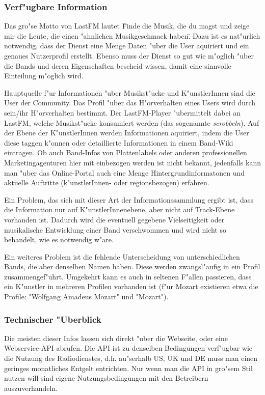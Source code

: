 \subsubsection{Verf"ugbare Information}
Das gro"se Motto von LastFM lautet \"Finde die Musik, die du magst und zeige mir die Leute, die einen "ahnlichen Musikgeschmack haben\". Dazu ist es nat"urlich notwendig, dass der Dienst eine Menge Daten "uber die User aquiriert und ein genaues Nutzerprofil erstellt. Ebenso muss der Dienst so gut wie m"oglich "uber die Bands und deren Eigenschaften bescheid wissen, damit eine sinnvolle Einteilung m"oglich wird.

Hauptquelle f"ur Informationen "uber Musikst"ucke und K"unstlerInnen sind die User der Community. Das Profil "uber das H"orverhalten eines Users wird durch sein/ihr H"orverhalten bestimmt. Der LastFM-Player "ubermittelt dabei an LastFM, welche Musikst"ucke konsumiert werden (das sogenannte \textit{scrobbeln}). Auf der Ebene der K"unstlerInnen werden Informationen aquiriert, indem die User diese taggen k"onnen oder detaillierte Informationen in einem Band-Wiki eintragen. Ob auch Band-Infos von Plattenlabels oder anderen professionellen Marketingagenturen hier mit einbezogen werden ist nicht bekannt, jedenfalls kann man "uber das Online-Portal auch eine Menge Hintergrundinformatonen und aktuelle Auftritte (k"unstlerInnen- oder regionsbezogen) erfahren. 

Ein Problem, das sich mit dieser Art der Informationssammlung ergibt ist, dass die Information nur auf K"unstlerInnenebene, aber nicht auf Track-Ebene vorhanden ist. Dadurch wird die eventuell gegebene Vielseitigkeit oder musikalische Entwicklung einer Band verschwommen und wird nicht so behandelt, wie es notwendig w"are. 

Ein weiteres Problem ist die fehlende Unterscheidung von unterschiedlichen Bands, die aber denselben Namen haben. Diese werden zwangsl"aufig in ein Profil zusammengef"uhrt. Umgekehrt kann es auch in seltenen F"allen passieren, dass ein K"unstler in mehreren Profilen vorhanden ist (f"ur Mozart existieren etwa die Profile: "Wolfgang Amadeus Mozart" und "Mozart").

\subsubsection{Technischer "Uberblick}
Die meisten dieser Infos lassen sich direkt "uber die Webseite, oder eine Webservice-API abrufen. Die API ist zu denselben Bedingungen verf"ugbar wie die Nutzung des Radiodienstes, d.h. au"serhalb US, UK und DE muss man einen geringes monatliches Entgelt entrichten. Nur wenn man die API in gro"sem Stil nutzen will sind eigene Nutzungsbedingungen mit den Betreibern auszuverhandeln.

